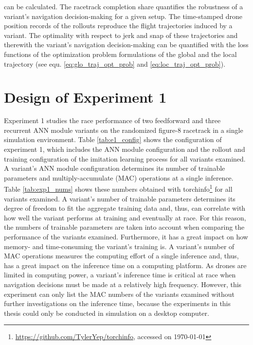 can be calculated.
The racetrack completion share quantifies
the robustness of a variant's navigation decision-making 
for a given setup.
The time-stamped drone position records of the rollouts
reproduce the flight trajectories induced by a variant.
The optimality with respect to jerk and snap
of these trajectories and therewith the 
variant's navigation decision-making 
can be quantified
with the loss functions of the optimization problem formulations
of the global and the local trajectory
(see equ. \ref{eq:glo_traj_opt_prob} and \ref{eq:loc_traj_opt_prob}).









\section{Design of Experiment 1}
Experiment 1 studies the
race performance of 
two feedforward and three recurrent ANN module variants 
on the randomized figure-8 racetrack 
in a single simulation environment.
Table \ref{tab:e1_config} shows the
configuration of experiment 1,
which includes the ANN module configuration
and the rollout and training configuration 
of the imitation learning process
for all variants examined.
A variant's ANN module configuration
determines its number of trainable parameters and 
multiply-accumulate (MAC) operations at a single inference.
Table \ref{tab:exp1_nums} shows these
numbers
obtained with 
torchinfo\footnote{\url{https://github.com/TylerYep/torchinfo}, accessed on \today}
for all variants examined.
A variant's number of trainable parameters
determines its degree of freedom to fit the aggregate training data
and, thus,
can correlate with 
how well the variant performs at training
and eventually at race.
For this reason, the numbers of trainable parameters 
are taken into account
when comparing the performance of the variants examined.
Furthermore, it has a great impact on
how memory- and time-consuming the variant's training is.
A variant's number of MAC operations 
measures the computing effort of a single inference
and, thus, has a great impact on the inference time
on a computing platform.
As drones are limited in computing power,
a variant's inference time 
is critical at race when 
navigation decisions
must be made at a relatively high frequency.
However, this experiment
can only list the MAC numbers of the variants examined
without further investigations on the inference time,
because the experiments in this thesis
could only be conducted in simulation on a desktop computer.


